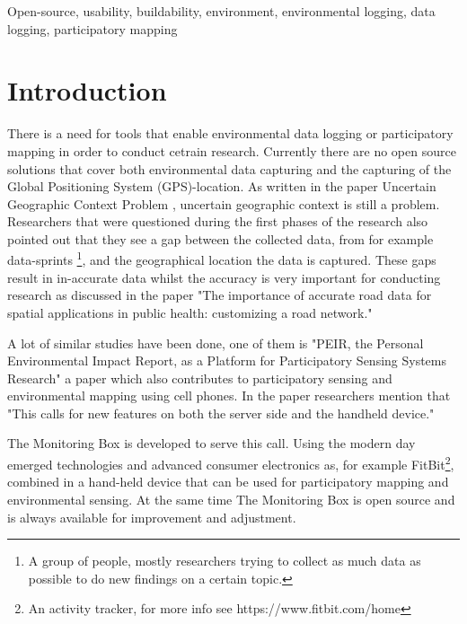 \documentclass[conference]{IEEEtran}
\begin{document}
\begin{IEEEkeywords}
Open-source, usability, buildability, environment, environmental logging, data logging, participatory mapping 
\end{IEEEkeywords}

\IEEEpeerreviewmaketitle
\section{Introduction}
There is a need for tools that enable environmental data logging or participatory mapping in order to conduct cetrain research. Currently there are no open source solutions that cover both environmental data capturing and the capturing of the Global Positioning System (GPS)-location. As written in the paper Uncertain Geographic Context Problem \cite{kwan2012uncertain}, uncertain geographic context is still a problem. Researchers that were questioned during the first phases of the research also pointed out that they see a gap between the collected data, from for example data-sprints \footnote{ A group of people, mostly researchers trying to collect as much data as possible to do new findings on a certain topic.}, and the geographical location the data is captured. These gaps result in in-accurate data whilst the accuracy is very important for conducting research as discussed in the paper "The importance of accurate road data for spatial applications in public health: customizing a road network." \cite{frizzelle2009importance}

\par
A lot of similar studies have been done, one of them is "PEIR, the Personal Environmental Impact Report, as a Platform for Participatory Sensing Systems Research"
 \cite{mun2009peir} a paper which also contributes to participatory sensing and environmental mapping using cell phones. In the paper researchers mention that "This calls for new features on both the server side and the handheld device."  \cite{mun2009peir} 
\par
The Monitoring Box is developed to serve this call. Using the modern day emerged technologies and advanced consumer electronics as, for example FitBit\footnote{ An activity tracker, for more info see https://www.fitbit.com/home}, combined in a hand-held device that can be used for participatory mapping and environmental sensing. At the same time The Monitoring Box is open source and is always available for improvement and adjustment.  
\end{document}
